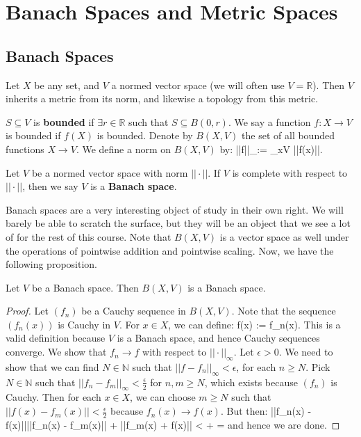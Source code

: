 \newpage

\section{Banach Spaces and Metric Spaces}

\subsection{Banach Spaces}

	Let $X$ be any set, and $V$ a normed vector space (we will often use $V = \mathbb R$). Then $V$ inherits a metric from 
	its norm, and likewise a topology from this metric. 
	
	\begin{definition}
		$S\subseteq V$ is \textbf{bounded} if $\exists r\in\mathbb R$ such that $S\subseteq B(0, r)$. We say a function 
		$f : X\rightarrow V$ is bounded if $f(X)$ is bounded. Denote by $B(X, V)$ the set of all bounded functions 
		$X\rightarrow V$. We define a norm on $B(X, V)$ by:
		\eq
			||f||_\infty := \sup_{x\in V} ||f(x)||.
		\qe
	\end{definition}
	
	\begin{definition}
		Let $V$ be a normed vector space with norm $||\cdot||$. If $V$ is complete with respect to $||\cdot||$, then we say 
		$V$ is a \textbf{Banach space}.
	\end{definition}
	
	Banach spaces are a very interesting object of study in their own right. We will barely be able to scratch the surface, 
	but they will be an object that we see a lot of for the rest of this course. Note that $B(X, V)$ is a vector space as 
	well under the operations of pointwise addition and pointwise scaling. Now, we have the following proposition.
	
	\begin{prop}
		Let $V$ be a Banach space. Then $B(X, V)$ is a Banach space. 
	\end{prop}
	
	\begin{proof}
		Let $(f_n)$ be a Cauchy sequence in $B(X, V)$. Note that the sequence $(f_n(x))$ is Cauchy in $V$. For $x\in X$, 
		we can define:
		\eq
			f(x) := \lim f_n(x).
		\qe
		This is a valid definition because $V$ is a Banach space, and hence Cauchy sequences converge. We show that 
		$f_n\rightarrow f$ with respect to $||\cdot||_\infty$. Let $\epsilon > 0$. We need to show that we can find $N\in
		\mathbb N$ such that $||f - f_n||_\infty < \epsilon$, for each $n \geq N$. Pick $N\in\mathbb N$ such that 
		$||f_n - f_m||_\infty < \frac{\epsilon}{2}$ for $n, m\geq N$, which exists because $(f_n)$ is Cauchy. Then for 
		each $x\in X$, we can choose $m \geq N$ such that $||f(x) - f_m(x)|| < \frac{\epsilon}{2}$ because $f_n(x)
		\rightarrow f(x)$. But then:
		\eq
			||f_n(x) - f(x)||\leq ||f_n(x) - f_m(x)|| + ||f_m(x) + f(x)|| <  +  = \epsilon
		\qe
		and hence we are done.
	\end{proof}
	
